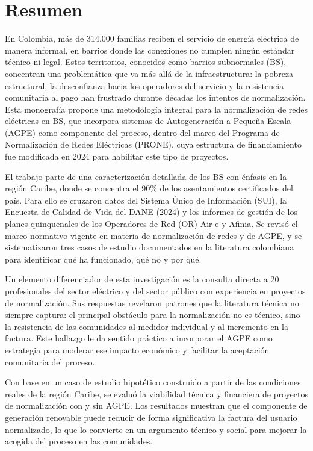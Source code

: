 
\chapter*{Resumen}

En Colombia, más de 314.000 familias reciben el servicio de energía eléctrica de manera informal, en barrios donde las conexiones no cumplen ningún estándar técnico ni legal. Estos territorios, conocidos como barrios subnormales (BS), concentran una problemática que va más allá de la infraestructura: la pobreza estructural, la desconfianza hacia los operadores del servicio y la resistencia comunitaria al pago han frustrado durante décadas los intentos de normalización. Esta monografía propone una metodología integral para la normalización de redes eléctricas en BS, que incorpora sistemas de Autogeneración a Pequeña Escala (AGPE) como componente del proceso, dentro del marco del Programa de Normalización de Redes Eléctricas (PRONE), cuya estructura de financiamiento fue modificada en 2024 para habilitar este tipo de proyectos.

El trabajo parte de una caracterización detallada de los BS con énfasis en la región Caribe, donde se concentra el 90\% de los asentamientos certificados del país. Para ello se cruzaron datos del Sistema Único de Información (SUI), la Encuesta de Calidad de Vida del DANE (2024) y los informes de gestión de los planes quinquenales de los Operadores de Red (OR) Air-e y Afinia. Se revisó el marco normativo vigente en materia de normalización de redes y de AGPE, y se sistematizaron tres casos de estudio documentados en la literatura colombiana para identificar qué ha funcionado, qué no y por qué.

Un elemento diferenciador de esta investigación es la consulta directa a 20 profesionales del sector eléctrico y del sector público con experiencia en proyectos de normalización. Sus respuestas revelaron patrones que la literatura técnica no siempre captura: el principal obstáculo para la normalización no es técnico, sino la resistencia de las comunidades al medidor individual y al incremento en la factura. Este hallazgo le da sentido práctico a incorporar el AGPE como estrategia para moderar ese impacto económico y facilitar la aceptación comunitaria del proceso.

Con base en un caso de estudio hipotético construido a partir de las condiciones reales de la región Caribe, se evaluó la viabilidad técnica y financiera de proyectos de normalización con y sin AGPE. Los resultados muestran que el componente de generación renovable puede reducir de forma significativa la factura del usuario normalizado, lo que lo convierte en un argumento técnico y social para mejorar la acogida del proceso en las comunidades.

